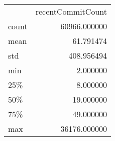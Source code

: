 \begin{tabular}{lr}
 & recentCommitCount \\
count & 60966.000000 \\
mean & 61.791474 \\
std & 408.956494 \\
min & 2.000000 \\
25\% & 8.000000 \\
50\% & 19.000000 \\
75\% & 49.000000 \\
max & 36176.000000 \\
\end{tabular}
